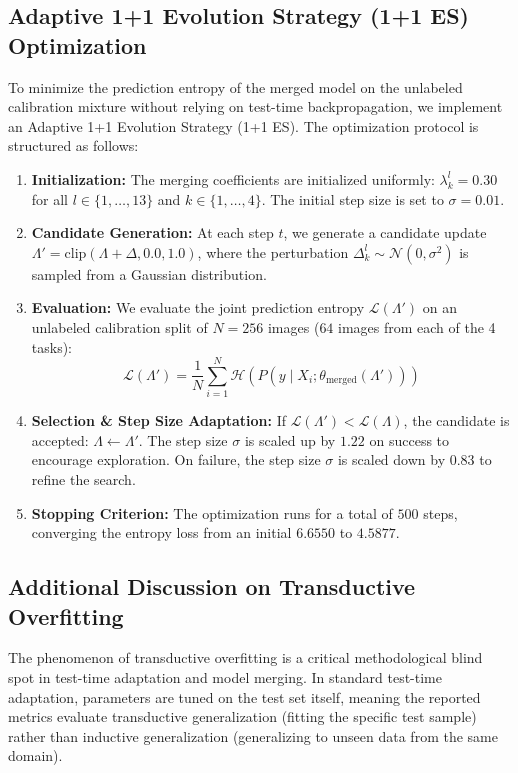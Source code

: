 \documentclass{article}
\theoremstyle{plain}
\theoremstyle{definition}
\theoremstyle{remark}
\begin{document}
\subsection{Adaptive 1+1 Evolution Strategy (1+1 ES) Optimization}
To minimize the prediction entropy of the merged model on the unlabeled calibration mixture without relying on test-time backpropagation, we implement an Adaptive 1+1 Evolution Strategy (1+1 ES). The optimization protocol is structured as follows:
\begin{enumerate}
    \item \textbf{Initialization:} The merging coefficients are initialized uniformly: $\lambda^l_k = 0.30$ for all $l \in \{1,\dots,13\}$ and $k \in \{1,\dots,4\}$. The initial step size is set to $\sigma = 0.01$.
    \item \textbf{Candidate Generation:} At each step $t$, we generate a candidate update $\Lambda' = \text{clip}(\Lambda + \Delta, 0.0, 1.0)$, where the perturbation $\Delta^l_k \sim \mathcal{N}(0, \sigma^2)$ is sampled from a Gaussian distribution.
    \item \textbf{Evaluation:} We evaluate the joint prediction entropy $\mathcal{L}(\Lambda')$ on an unlabeled calibration split of $N = 256$ images ($64$ images from each of the 4 tasks):
    \begin{equation}
        \mathcal{L}(\Lambda') = \frac{1}{N} \sum_{i=1}^N \mathcal{H}(P(y \mid X_i; \theta_{\text{merged}}(\Lambda')))
    \end{equation}
    \item \textbf{Selection \& Step Size Adaptation:} If $\mathcal{L}(\Lambda') < \mathcal{L}(\Lambda)$, the candidate is accepted: $\Lambda \leftarrow \Lambda'$. The step size $\sigma$ is scaled up by $1.22$ on success to encourage exploration. On failure, the step size $\sigma$ is scaled down by $0.83$ to refine the search.
    \item \textbf{Stopping Criterion:} The optimization runs for a total of $500$ steps, converging the entropy loss from an initial $6.6550$ to $4.5877$.
\end{enumerate}

\subsection{Additional Discussion on Transductive Overfitting}
The phenomenon of transductive overfitting is a critical methodological blind spot in test-time adaptation and model merging. In standard test-time adaptation, parameters are tuned on the test set itself, meaning the reported metrics evaluate transductive generalization (fitting the specific test sample) rather than inductive generalization (generalizing to unseen data from the same domain). 
\end{document}
